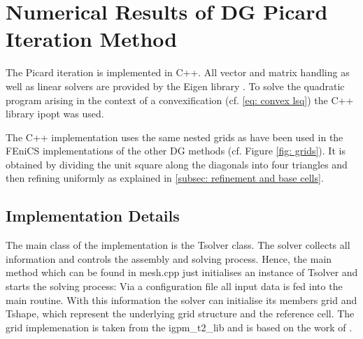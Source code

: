 
\newpage

\section{Numerical Results of DG Picard Iteration Method} \label{sec: numerical results our Method}

The Picard iteration is implemented in C++. All vector and matrix handling as well as linear solvers are provided by the Eigen library \cite{eigenweb}. To solve the quadratic program arising in the context of a convexification (cf. \eqref{eq: convex lsq}) the C++ library ipopt \cite{ipopt} was used.

The C++ implementation uses the same nested grids as have been used in the FEniCS implementations of the other DG methods (cf. Figure \ref{fig: grids}). It is obtained by dividing the unit square along the diagonals into four triangles and then refining uniformly as explained in \ref{subsec: refinement and base cells}.

\subsection{Implementation Details}

The main class of the implementation is the Tsolver class. The solver collects all information and controls the assembly and solving process.
Hence, the main method which can be found in mesh.cpp just initialises an instance of Tsolver and starts the solving process: Via a configuration file all input data is fed into the main routine. With this information the solver can initialise its members grid and Tshape, which represent the underlying grid structure and the reference cell. 
The grid implemenation is taken from the igpm\_t2\_lib and is based on the work of \cite{BMV2009}.

